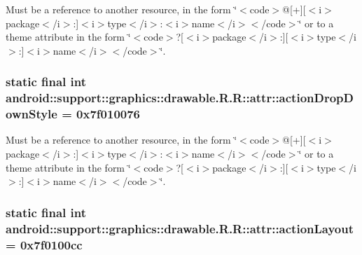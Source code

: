 Must be a reference to another resource, in the form \char`\"{}$<$code$>$@\mbox{[}+\mbox{]}\mbox{[}$<$i$>$package$<$/i$>$:\mbox{]}$<$i$>$type$<$/i$>$:$<$i$>$name$<$/i$>$$<$/code$>$\char`\"{} or to a theme attribute in the form \char`\"{}$<$code$>$?\mbox{[}$<$i$>$package$<$/i$>$:\mbox{]}\mbox{[}$<$i$>$type$<$/i$>$:\mbox{]}$<$i$>$name$<$/i$>$$<$/code$>$\char`\"{}. \hypertarget{classandroid_1_1support_1_1graphics_1_1drawable_1_1_r_1_1attr_6d798a8534361334a19285532f5ab72d}{
\subsubsection[{actionDropDownStyle}]{\setlength{\rightskip}{0pt plus 5cm}static final int android::support::graphics::drawable.R.R::attr::actionDropDownStyle = 0x7f010076}}
\label{classandroid_1_1support_1_1graphics_1_1drawable_1_1_r_1_1attr_6d798a8534361334a19285532f5ab72d}


Must be a reference to another resource, in the form \char`\"{}$<$code$>$@\mbox{[}+\mbox{]}\mbox{[}$<$i$>$package$<$/i$>$:\mbox{]}$<$i$>$type$<$/i$>$:$<$i$>$name$<$/i$>$$<$/code$>$\char`\"{} or to a theme attribute in the form \char`\"{}$<$code$>$?\mbox{[}$<$i$>$package$<$/i$>$:\mbox{]}\mbox{[}$<$i$>$type$<$/i$>$:\mbox{]}$<$i$>$name$<$/i$>$$<$/code$>$\char`\"{}. \hypertarget{classandroid_1_1support_1_1graphics_1_1drawable_1_1_r_1_1attr_d3f7237664ced125d1f72453012d4324}{
\subsubsection[{actionLayout}]{\setlength{\rightskip}{0pt plus 5cm}static final int android::support::graphics::drawable.R.R::attr::actionLayout = 0x7f0100cc}}
\label{classandroid_1_1support_1_1graphics_1_1drawable_1_1_r_1_1attr_d3f7237664ced125d1f72453012d4324}


